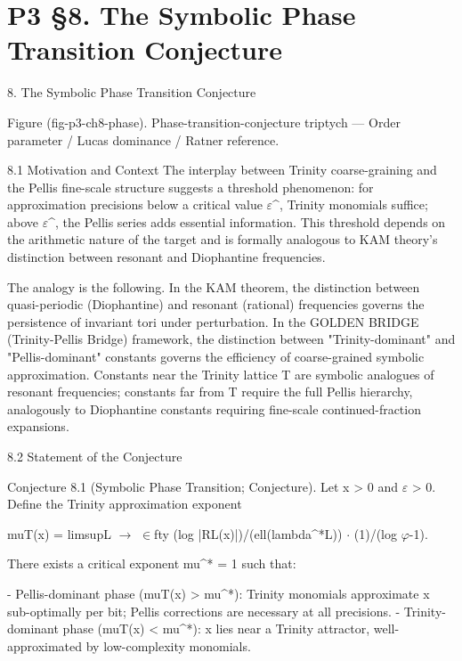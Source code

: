 
\section{P3 §8. The Symbolic Phase Transition Conjecture}

8. The Symbolic Phase Transition Conjecture

         Figure (fig-p3-ch8-phase). Phase-transition-conjecture triptych --- Order parameter / Lucas
                                       dominance / Ratner reference.

  8.1 Motivation and Context
  The interplay between Trinity coarse-graining and the Pellis fine-scale structure
  suggests a threshold phenomenon: for approximation precisions below a critical value
  $\varepsilon$^, Trinity monomials suffice; above $\varepsilon$^, the Pellis series adds essential information.
  This threshold depends on the arithmetic nature of the target and is formally analogous
  to KAM theory's distinction between resonant and Diophantine frequencies.

  The analogy is the following. In the KAM theorem, the distinction between
  quasi-periodic (Diophantine) and resonant (rational) frequencies governs the
  persistence of invariant tori under perturbation. In the GOLDEN BRIDGE (Trinity-Pellis Bridge) framework, the
  distinction between "Trinity-dominant" and "Pellis-dominant" constants governs the
  efficiency of coarse-grained symbolic approximation. Constants near the Trinity lattice
  T are symbolic analogues of resonant frequencies; constants far from T require the full
  Pellis hierarchy, analogously to Diophantine constants requiring fine-scale
  continued-fraction expansions.

  8.2 Statement of the Conjecture

        Conjecture 8.1 (Symbolic Phase Transition; Conjecture). Let x > 0 and $\varepsilon$ > 0.
        Define the Trinity approximation exponent

  muT(x) = limsupL $\rightarrow$ $\in$fty (log |RL(x)|)/(ell(lambda^*L)) $\cdot$ (1)/(log $\varphi$-1).

  There exists a critical exponent mu^* = 1 such that:

  - Pellis-dominant phase (muT(x) > mu^*): Trinity monomials approximate                                 x
  sub-optimally per bit; Pellis corrections are necessary at all precisions.
  - Trinity-dominant phase (muT(x) < mu^*): x lies near a Trinity attractor,
  well-approximated by low-complexity monomials.

